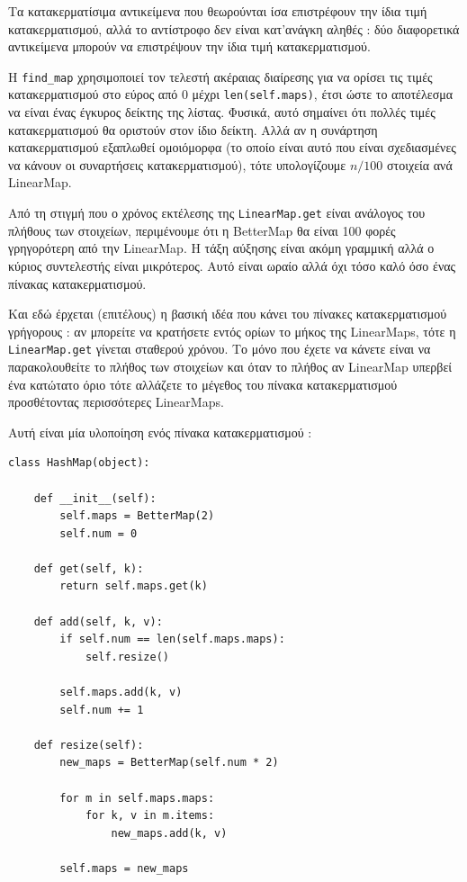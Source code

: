 \documentclass[10pt]{book}
\begin{document}
Τα κατακερματίσιμα αντικείμενα που θεωρούνται ίσα επιστρέφουν την ίδια τιμή κατακερματισμού, αλλά το αντίστροφο δεν είναι κατ'ανάγκη αληθές :  δύο 
διαφορετικά αντικείμενα μπορούν να επιστρέψουν την ίδια τιμή κατακερματισμού.

Η  \verb"find_map"  χρησιμοποιεί τον τελεστή ακέραιας διαίρεσης για να ορίσει 
τις τιμές κατακερματισμού στο εύρος από 0 μέχρι  {\tt len(self.maps)},  έτσι 
ώστε το αποτέλεσμα να είναι ένας έγκυρος δείκτης της λίστας.  Φυσικά, αυτό σημαίνει 
ότι πολλές τιμές κατακερματισμού θα οριστούν στον ίδιο δείκτη. Αλλά αν η συνάρτηση 
κατακερματισμού εξαπλωθεί ομοιόμορφα (το οποίο είναι αυτό που είναι σχεδιασμένες να κάνουν οι συναρτήσεις κατακερματισμού), τότε υπολογίζουμε $n/100$ στοιχεία ανά  
LinearMap.

 Από τη στιγμή που ο χρόνος εκτέλεσης της  {\tt LinearMap.get}  είναι ανάλογος του πλήθους των στοιχείων, περιμένουμε ότι η  BetterMap  θα είναι 
100 φορές γρηγορότερη από την  LinearMap.   Η τάξη αύξησης είναι ακόμη γραμμική αλλά ο κύριος συντελεστής είναι μικρότερος.  Αυτό είναι ωραίο αλλά όχι τόσο καλό όσο ένας πίνακας κατακερματισμού.

Και εδώ έρχεται (επιτέλους) η βασική ιδέα που κάνει του πίνακες κατακερματισμού γρήγορους :  αν μπορείτε να κρατήσετε εντός ορίων το μήκος της  LinearMaps,  τότε η  {\tt LinearMap.get}  γίνεται σταθερού χρόνου.  Το 
μόνο που έχετε να κάνετε είναι να παρακολουθείτε το πλήθος των στοιχείων και όταν 
το πλήθος αν  LinearMap  υπερβεί ένα κατώτατο όριο τότε αλλάζετε το μέγεθος του πίνακα κατακερματισμού προσθέτοντας περισσότερες  LinearMaps.

 Αυτή είναι μία υλοποίηση ενός πίνακα κατακερματισμού :

\begin{verbatim}
class HashMap(object):

    def __init__(self):
        self.maps = BetterMap(2)
        self.num = 0

    def get(self, k):
        return self.maps.get(k)

    def add(self, k, v):
        if self.num == len(self.maps.maps):
            self.resize()

        self.maps.add(k, v)
        self.num += 1

    def resize(self):
        new_maps = BetterMap(self.num * 2)

        for m in self.maps.maps:
            for k, v in m.items:
                new_maps.add(k, v)

        self.maps = new_maps
\end{verbatim}
\end{document}
